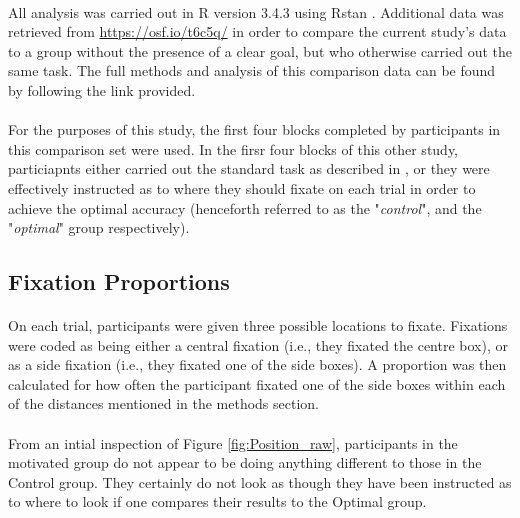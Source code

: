 \documentclass[12pt]{article}
\begin{document}
\paragraph{} All analysis was carried out in R version 3.4.3 \citep{R} using Rstan \citep{Rstan,Stan}. Additional data was retrieved from \url{https://osf.io/t6c5q/} in order to compare the current study's data to a group without the presence of a clear goal, but who otherwise carried out the same task. The full methods and analysis of this comparison data can be found by following the link provided. 

\paragraph{} For the purposes of this study, the first four blocks completed by participants in this comparison set were used. In the firsr four blocks of this other study, particiapnts either carried out the standard task as described in \cite{clarke2015failure}, or they were effectively instructed as to where they should fixate on each trial in order to achieve the optimal accuracy (henceforth referred to as the "\textit{control}", and the "\textit{optimal}" group respectively).

\subsection*{Fixation Proportions}
\paragraph{} On each trial, participants were given three possible locations to fixate. Fixations were coded as being either a central fixation (i.e., they fixated the centre box), or as a side fixation (i.e., they fixated one of the side boxes). A proportion was then calculated for how often the participant fixated one of the side boxes within each of the distances mentioned in the methods section. 

\paragraph{} From an intial inspection of Figure \ref{fig:Position_raw}, participants in the motivated group do not appear to be doing anything different to those in the Control group. They certainly do not look as though they have been instructed as to where to look if one compares their results to the Optimal group. 
\end{document}
